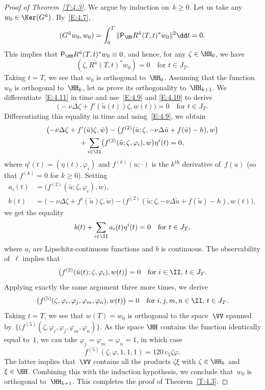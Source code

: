 \begin{proof}[Proof of Theorem~\ref{T:4.3}]
We argue by induction on~$k \ge 0$. Let us take any $w_0\in \Ker(G^{\tilde u})$. By~\eqref{E:4.7},
\[
(G^{\tilde u}w_0,w_0)=\int_0^T\|{\mathsf P}_\HH R^{\tilde u}(T,t)^*w_0\|^2\dd t=0.
\]
This implies that ${\mathsf P}_\HH R^{\tilde u}(T,t)^*w_0\equiv0$, and hence, for any $\zeta\in\HH_0$, we have
\begin{equation} \label{E:4.11}
(\zeta,R^{\tilde u}(T,t)^*w_0)=0\quad \text{for $t\in J_T$}.
\end{equation}
Taking $t=T$, we see that $w_0$ is orthogonal to~$\HH_0$. Assuming that the function~$w_0$ is orthogonal to~$\HH_k$, let us prove its orthogonality to~$\HH_{k+1}$. We differentiate~\eqref{E:4.11} in time and use~\eqref{E:4.9} and \eqref{E:4.10} to derive
\[
\bigl(-\nu\Delta \zeta+f'(\tilde u(t))\zeta,w(t)\bigr)=0\quad\text{for $t\in J_T$}.
\]
Differentiating this equality in time and using~\eqref{E:4.9}, we obtain\vspace*{-3pt}
\begin{multline*}
\bigl(-\nu\Delta\zeta+f'(\tilde u)\zeta,\dot w\bigr)-\bigl(f^{(2)}(\tilde u;\zeta,-\nu\Delta\tilde u+f(\tilde u)-h),w\bigr)\\
+\sum_{i\in\II}\bigl(f^{(2)}(\tilde u;\zeta,\varphi_i),w\bigr)\eta^i(t)=0,
\end{multline*}
where $\eta^i(t)=(\eta(t),\varphi_i)$ and $f^{(k)}(u;\cdot)$ is the $k^\text{th}$ derivative of~$f(u)$ (so that $f^{(k)}=0$ for $k\ge6$). Setting\vspace*{-3pt}
\begin{align*}
a_i(t)&=\bigl(f^{(2)}(\tilde u;\zeta,\varphi_i),w\bigr),\\
b(t)&= \bigl(-\nu\Delta\zeta+f'(\tilde u)\zeta,\dot w\bigr)-\bigl(f^{(2)}(\tilde u;\zeta,-\nu\Delta\tilde u+f(\tilde u)-h),w(t)\bigr),
\end{align*} we get the equality\vspace*{-3pt}
\[
b(t)+\sum_{i\in\II}a_i(t)\eta^i(t)=0\quad\text{for $t\in J_T$},
\] where $a_i$
are Lipschitz-continuous functions and $b$ is continuous. The observability of~$\ell$ implies that\vspace*{-3pt}
\begin{equation*}
\bigl(f^{(2)}(\tilde u(t);\zeta,\varphi_i),w(t)\bigr)=0
\quad\text{for $i\in\II$, $t\in J_T$}.
\end{equation*}
Applying exactly the same argument three more times, we derive\vspace*{-3pt}
\[
\bigl(f^{(5)}(\zeta,\varphi_i,\varphi_j,\varphi_m,\varphi_n),w(t)\bigr)=0
\quad\text{for $i,j,m,n\in\II$, $t\in J_T$}.
\]
Taking $t=T$, we see that $w(T)=w_0$ is orthogonal to the space~$\VV$ spanned by~$\{(f^{(5)}(\zeta,\varphi_i,\varphi_j,\varphi_m,\varphi_n)\}$. As the space $\HH$ contains the function identically equal to~$1$, we can take $\varphi_j=\varphi_m=\varphi_n=1$, in which case\vspace*{-3pt}
\[
f^{(5)}(\zeta,\varphi,1,1,1)=120\,c_5 \zeta\varphi.
\]
The latter implies that~$\VV$ contains all the products $\zeta\xi$ with $\zeta\in\HH_k$ and $\xi\in\HH$. Combining this with the induction hypothesis, we conclude that~$w_0$ is orthogonal to~$\HH_{k+1}$. This completes the proof of Theorem~\ref{T:4.3}.
\end{proof}

